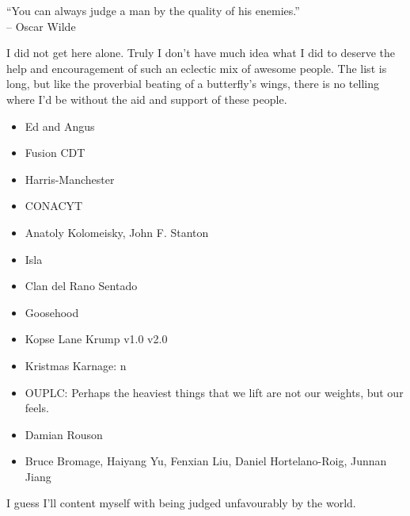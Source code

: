 \begin{frontmatter}[Acknowledgements]
    \centering
    ``You can always judge a man by the quality of his enemies.''\\
    -- Oscar Wilde

    \justify
    I did not get here alone. Truly I don't have much idea what I did to deserve the help and encouragement of such an eclectic mix of awesome people. The list is long, but like the proverbial beating of a butterfly's wings, there is no telling where I'd be without the aid and support of these people.
    
    \begin{itemize}
        \item Ed and Angus
        \item Fusion CDT
        \item Harris-Manchester
        \item CONACYT
        \item Anatoly Kolomeisky, John F. Stanton
        \item Isla
        \item Clan del Rano Sentado
        \item Goosehood
        \item Kopse Lane Krump v1.0 v2.0
        \item Kristmas Karnage: n
        \item OUPLC: Perhaps the heaviest things that we lift are not our weights, but our feels.
        \item Damian Rouson
        \item Bruce Bromage, Haiyang Yu, Fenxian Liu, Daniel Hortelano-Roig, Junnan Jiang
    \end{itemize}

    I guess I'll content myself with being judged unfavourably by the world.
\end{frontmatter}